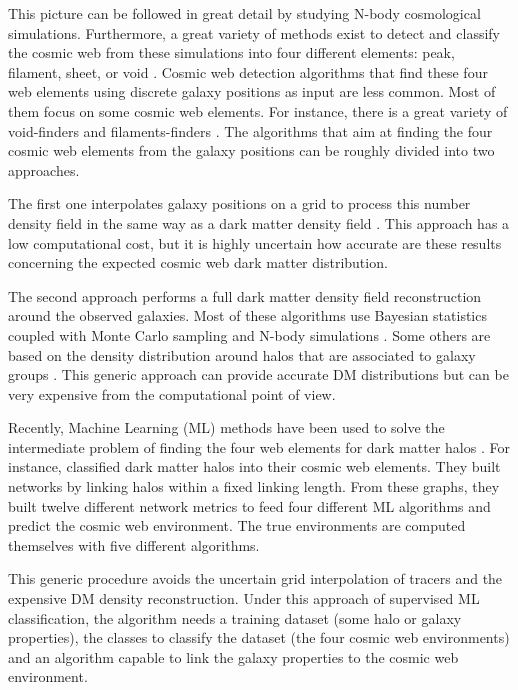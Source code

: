 \documentclass[usenatbib]{mnras}
\begin{document}
This picture can be followed in great detail by studying N-body
cosmological simulations.   
Furthermore, a great variety of methods exist to detect and
classify the cosmic web from these simulations into four different 
elements: peak, filament, sheet, or void \citep{Libeskind2018}.
Cosmic web detection algorithms that find these four web
elements using discrete galaxy positions as input are less
common.
Most of them focus on some cosmic web elements.
For instance, there is a great variety of void-finders
\citep{Platen2007,Neyrinck2008} and filaments-finders
\citep{Novikov2003,Zhang2009,Sousbie2010,Chen2015,Luber2019}.   
The algorithms that aim at finding the four cosmic web elements from
the galaxy positions can be roughly divided into two approaches.

The first one interpolates galaxy positions on a grid to process
this number density field in the same way as a dark matter density
field \citep{Eardley2015,Alpaslan2016,Tojeiro2017,Shadab2019}.
This approach has a low computational cost, but it is highly uncertain
how accurate are these results concerning the expected cosmic
web dark matter distribution.

The second approach performs a full dark matter density field
reconstruction around the observed galaxies.
Most of these algorithms use Bayesian statistics coupled with Monte
Carlo sampling  and N-body
simulations \citep{Jasche2010,Jasche2013a,Bos2014,LeclercqJasche2015,Horowitz2019,Burchett2020}. 
Some others are based on the density distribution around halos that
are associated to galaxy groups \citep{Wang2009,2011MNRAS.417.1303M}.  
This generic approach can provide accurate DM distributions but can
be very expensive from the computational point of view. 

Recently, Machine Learning (ML) methods have been used to solve the intermediate problem of finding the four web elements for dark matter
halos \citep{Hui2018,Tsizh2019}.
For instance, \citep{Tsizh2019} classified
dark matter halos into their cosmic web elements. 
They built networks by linking halos within a fixed linking length.
From these graphs, they built twelve different network metrics to feed
four different ML algorithms and predict the cosmic web
environment. 
The true environments are computed themselves with five different
algorithms.  

This generic procedure avoids the uncertain grid interpolation of
tracers and the expensive DM density reconstruction. 
Under this approach of supervised ML classification, 
the algorithm needs a training dataset (some halo or galaxy
properties), the classes to classify the dataset (the four cosmic web
environments) and an algorithm capable to link the galaxy properties
to the cosmic web environment. 
\end{document}
